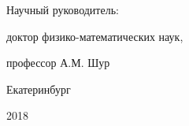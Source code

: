 \begin{titlepage}
\begin{multicols}{2}
\begin{centering}
		\underline{\hspace{60mm}}
		
		\vspace{14pt}
		
		Научный руководитель:
		
		доктор физико-математических наук,
		
		профессор А.М. Шур
		
		\underline{\hspace{60mm}}
		
	\end{centering}
\end{multicols}
 

\fontsize{14}{16}\selectfont	\vfill
Екатеринбург

2018
		
\end{titlepage}